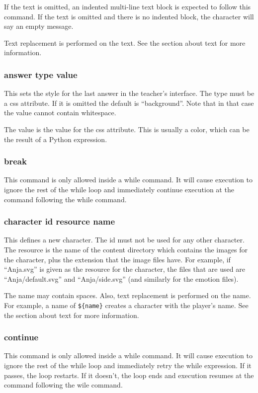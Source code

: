 \documentclass{article}
\begin{document}
If the text is omitted, an indented multi-line text block is expected to follow
this command. If the text is omitted and there is no indented block, the
character will say an empty message.

Text replacement is performed on the text. See the section about text for more
information.

\subsubsection{answer type value}
This sets the style for the last answer in the teacher's interface. The type
must be a css attribute. If it is omitted the default is ``background''. Note
that in that case the value cannot contain whitespace.

The value is the value for the css attribute. This is usually a color, which
can be the result of a Python expression.

\subsubsection{break}
This command is only allowed inside a while command. It will cause execution to
ignore the rest of the while loop and immediately continue execution at the
command following the while command.

\subsubsection{character id resource name}
This defines a new character. The id must not be used for any other character.
The resource is the name of the content directory which contains the images for
the character, plus the extension that the image files have. For example, if
``Anja.svg'' is given as the resource for the character, the files that are
used are ``Anja/default.svg'' and ``Anja/side.svg'' (and similarly for the
emotion files).

The name may contain spaces. Also, text replacement is performed on the name.
For example, a name of \verb-${name}- creates a character with the player's
name. See the section about text for more information.

\subsubsection{continue}
This command is only allowed inside a while command. It will cause execution to
ignore the rest of the while loop and immediately retry the while expression.
If it passes, the loop restarts. If it doesn't, the loop ends and execution
resumes at the command following the wile command.
\end{document}
